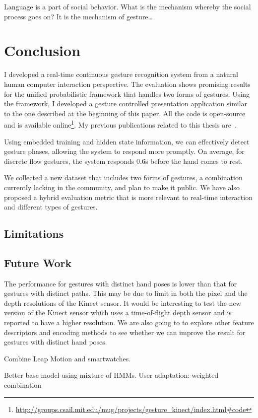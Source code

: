 \begin{savequote}
Language is a part of social behavior. What is the mechanism whereby the social
process goes on? It is the mechanism of gesture\ldots
{}
\end{savequote}
\chapter{Conclusion}
I developed a real-time continuous gesture recognition system from a natural
human computer interaction perspective.
The evaluation shows promising results for the unified probabilistic framework
that handles two forms of gestures. Using the
framework, I developed a gesture controlled presentation application similar to
the one described at the beginning of this paper. All the code is open-source
and is available
online\footnote{\url{http://groups.csail.mit.edu/mug/projects/gesture_kinect/index.html\#code}}.
My previous publications related to this thesis are~\cite{yin12, yin10, yin13,
yin13-making}.


Using embedded training and hidden state information, we can effectively
detect gesture phases, allowing the system to respond more promptly. On average,
for discrete flow gestures, the system responds 0.6s before the hand comes to
rest. 

We collected a new dataset that includes two forms of gestures, a
combination currently lacking in the community, and plan to make it
public. We have also proposed a hybrid evaluation metric
that is more relevant to real-time interaction and different types of gestures.

\section{Limitations}
\section{Future Work}
The performance for gestures with distinct hand poses is lower than that for
gestures with distinct paths. This may be due to limit in
both the pixel and the depth resolutions of the Kinect sensor. It would be interesting to test
the new version of the Kinect sensor which uses a time-of-flight depth sensor
and is reported to have a higher resolution. We are also going to to explore
other feature descriptors and encoding methods to see whether we can
improve the result for gestures with distinct hand poses.

Combine Leap Motion and smartwatches.

Better base model using mixture of HMMs.
User adaptation: weighted combination